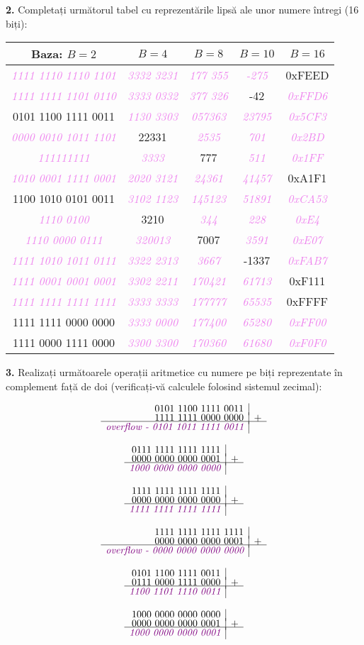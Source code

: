 \documentclass[a4paper]{article}
\renewcommand{\arraystretch}{1.4}
\newcommand{\hl}[1]{\textcolor{violet}{\textit{#1}}}
\newcommand{\binarysum}[3]{%
    \[
    \begin{array}{r|l}
    \text{#1} \\[-3pt]
    \text{#2} & + \\[-3pt]
    \hline
    \hl{#3} \\
    \end{array}
    \]
}
\begin{document}
\textbf{2.} Completați următorul tabel cu reprezentările lipsă ale unor numere întregi (16 biți):
\begin{table}[h!]
\centering
\renewcommand{\arraystretch}{1.3}
\setlength{\tabcolsep}{10pt}
\begin{tabular}{|c|c|c|c|c|}
\hline
\textbf{Baza: $B=2$} & \textbf{$B=4$} & \textbf{$B=8$} & \textbf{$B=10$} & \textbf{$B=16$} \\ \hline
 \hl{1111 1110 1110 1101} & \hl{3332 3231} & \hl{177 355} & \hl{-275} & 0xFEED \\ \hline
 \hl{1111 1111 1101 0110} & \hl{3333 0332} & \hl{377 326} & -42 & \hl{0xFFD6} \\ \hline
 0101 1100 1111 0011 & \hl{1130 3303} & \hl{057363} & \hl{23795} & \hl{0x5CF3} \\ \hline
 \hl{0000 0010 1011 1101} & 22331 & \hl{2535} & \hl{701} & \hl{0x2BD} \\ \hline
 \hl{111111111} & \hl{3333} & 777 & \hl{511} & \hl{0x1FF} \\ \hline
 \hl{1010 0001 1111 0001} & \hl{2020 3121} & \hl{24361} & \hl{41457} & 0xA1F1\\ \hline
 1100 1010 0101 0011 & \hl{3102 1123} & \hl{145123} & \hl{51891} & \hl{0xCA53} \\ \hline
 \hl{1110 0100} & 3210 & \hl{344} & \hl{228} & \hl{0xE4} \\ \hline
 \hl{1110 0000 0111} & \hl{320013} & 7007 & \hl{3591} & \hl{0xE07} \\ \hline
 \hl{1111 1010 1011 0111} & \hl{3322 2313} & \hl{3667} & -1337 & \hl{0xFAB7} \\ \hline
 \hl{1111 0001 0001 0001} & \hl{3302 2211} & \hl{170421} & \hl{61713} & 0xF111 \\ \hline
 \hl{1111 1111 1111 1111} & \hl{3333 3333} & \hl{177777} & \hl{65535} & 0xFFFF \\ \hline
 1111 1111 0000 0000 & \hl{3333 0000} & \hl{177400} & \hl{65280} & \hl{0xFF00} \\ \hline
 1111 0000 1111 0000 & \hl{3300 3300} & \hl{170360} & \hl{61680} & \hl{0xF0F0} \\ \hline
\end{tabular}
\end{table}
\vspace{0.75cm}

\textbf{3.} Realizați următoarele operații aritmetice cu numere pe biți reprezentate în complement față de doi (verificați-vă calculele folosind sistemul zecimal):
\begin{multicols}{2}
\binarysum{0101 1100 1111 0011}{1111 1111 0000 0000}{\textit{overflow} - \hl{0101 1011 1111 0011}}
\binarysum{0111 1111 1111 1111}{0000 0000 0000 0001}{\hl{1000 0000 0000 0000}}
\binarysum{1111 1111 1111 1111}{0000 0000 0000 0000}{\hl{1111 1111 1111 1111}}
\binarysum{1111 1111 1111 1111}{0000 0000 0000 0001}{\textit{overflow} - \hl{0000 0000 0000 0000}}
\binarysum{0101 1100 1111 0011}{0111 0000 1111 0000}{\hl{1100 1101 1110 0011}}
\binarysum{1000 0000 0000 0000}{0000 0000 0000 0001}{\hl{1000 0000 0000 0001}}
\end{multicols}
\end{document}
